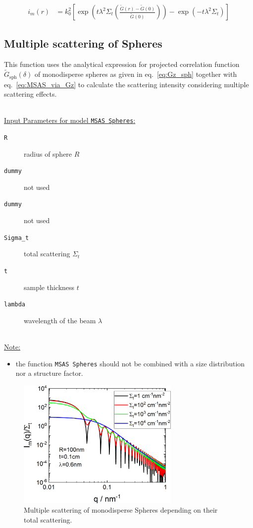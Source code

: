 \begin{align}
 i_m(r) &= k_0^2\left[\exp\left(t\lambda^2\Sigma_t\left(\frac{\tilde{G}(r)-\tilde{G}(0)}{\tilde{G}(0)}\right)\right)-\exp\left(-t\lambda^2\Sigma_t\right)\right]
 \label{eq:MSAS_via_Gz}
\end{align}

\newpage
\subsection{Multiple scattering of Spheres}

This function uses the analytical expression for projected correlation function $\tilde{G}_\mathrm{sph}(\delta)$ of monodisperse spheres as given in eq.\ \ref{eq:Gz_sph} together with eq.\ \ref{eq:MSAS_via_Gz} to calculate the scattering intensity considering multiple scattering effects.

\hspace{1pt}\\
\uline{Input Parameters for model \texttt{MSAS Spheres}:}\\
\begin{description}
\item[\texttt{R}] radius of sphere $R$
\item[\texttt{dummy}] not used
\item[\texttt{dummy}] not used
\item[\texttt{Sigma\_t}] total scattering $\Sigma_t$
\item[\texttt{t}] sample thickness $t$
\item[\texttt{lambda}] wavelength of the beam $\lambda$
\end{description}

\hspace{1pt}\\
\uline{Note:}
\begin{itemize}
\item the function \texttt{MSAS Spheres} should not be combined with a size distribution nor a structure factor.
\end{itemize}

\begin{figure}[htb]
\begin{center}
\includegraphics[width=0.7\textwidth]{../images/form_factor/MSAS/MSAS_Spheres.png}
\end{center}
\caption{Multiple scattering of monodisperse Spheres depending on their total scattering.}
\label{fig:MSAS_Spheres}
\end{figure}

